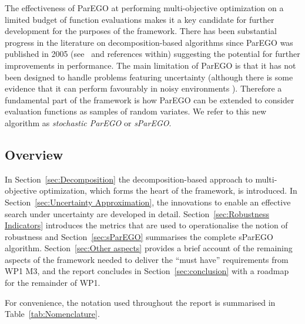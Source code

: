 \documentclass[a4paper]{article}
\begin{document}
The effectiveness of ParEGO at performing multi-objective optimization on a limited budget of function evaluations makes it a key candidate for further development for the purposes of the framework. There has been substantial progress in the literature on decomposition-based algorithms since ParEGO was published in 2005 (see~\cite{Giagkiozis2013Overview} and references within) suggesting the potential for further improvements in performance. The main limitation of ParEGO is that it has not been designed to handle problems featuring uncertainty (although there is some evidence that it can perform favourably in noisy environments \cite{knowles2009noisy}). Therefore a fundamental part of the framework is how ParEGO can be extended to consider evaluation functions as samples of random variates. We refer to this new algorithm as \emph{stochastic ParEGO} or \emph{sParEGO}.

\subsection{Overview}
In Section~\ref{sec:Decomposition} the decomposition-based approach to multi-objective optimization, which forms the heart of the framework, is introduced. In Section~\ref{sec:Uncertainty Approximation}, the innovations to enable an effective search under uncertainty are developed in detail. Section~\ref{sec:Robustness Indicators} introduces the  metrics that are used to operationalise the notion of robustness and Section~\ref{sec:sParEGO} summarises the complete sParEGO algorithm. Section~\ref{sec:Other aspects} provides a brief account of the remaining aspects of the framework needed to deliver the ``must have'' requirements from WP1 M3, and the report concludes in Section~\ref{sec:conclusion} with a roadmap for the remainder of WP1.

For convenience, the notation used throughout the report is summarised in Table~\ref{tab:Nomenclature}.
\end{document}
